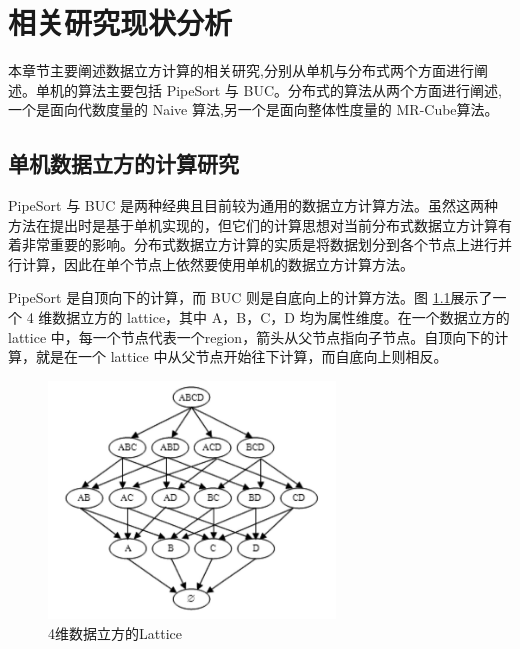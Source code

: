 \chapter{相关研究现状分析}

本章节主要阐述数据立方计算的相关研究,分别从单机与分布式两个方面进行阐述。单机的算法主要包括 PipeSort 与 BUC。分布式的算法从两个方面进行阐述,一个是面向代数度量的 Naive 算法,另一个是面向整体性度量的 MR-Cube算法。

\section{单机数据立方的计算研究}


PipeSort \cite{agarwal1996computation} 与 BUC \cite{beyer1999bottom} 是两种经典且目前较为通用的数据立方计算方法。虽然这两种方法在提出时是基于单机实现的，但它们的计算思想对当前分布式数据立方计算有着非常重要的影响。分布式数据立方计算的实质是将数据划分到各个节点上进行并行计算，因此在单个节点上依然要使用单机的数据立方计算方法。

PipeSort 是自顶向下的计算，而 BUC 则是自底向上的计算方法。图 \ref{4_dimension_lattice}展示了一个 4 维数据立方的 lattice，其中 A，B，C，D 均为属性维度。在一个数据立方的 lattice 中，每一个节点代表一个region，箭头从父节点指向子节点。自顶向下的计算，就是在一个 lattice 中从父节点开始往下计算，而自底向上则相反。

\begin{figure}[!htb]
\centering\includegraphics[width=3in]{picture/ch_current_research/4_dimension_lattice} 
\caption{4维数据立方的Lattice}\label{4_dimension_lattice} 
\end{figure} 

